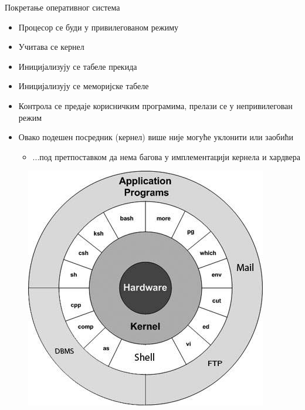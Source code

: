 \documentclass[xcolor=table]{beamer}
\begin{document}
    \begin{frame}[allowframebreaks]{Покретање оперативног система}
        \begin{itemize}
            \item Процесор се буди у привилегованом режиму
            \item Учитава се кернел
            \item Иницијализују се табеле прекида
            \item Иницијализују се меморијске табеле
            \item Контрола се предаје корисничким програмима, прелази се у непривилегован режим
            \item Овако подешен посредник (кернел) више није могуће уклонити или заобићи
            \begin{itemize}
                \item ...под претпоставком да нема багова у имплементацији кернела и хардвера
            \end{itemize}
        \end{itemize}
        
        \framebreak
        
        \begin{figure}
            \centering
            \includegraphics[width=\textwidth,height=0.8\textheight,keepaspectratio]{images/unix_architecture.jpg}
            \label{fig:unix_architecture.jpg}
        \end{figure}
    \end{frame}
    
\end{document}
